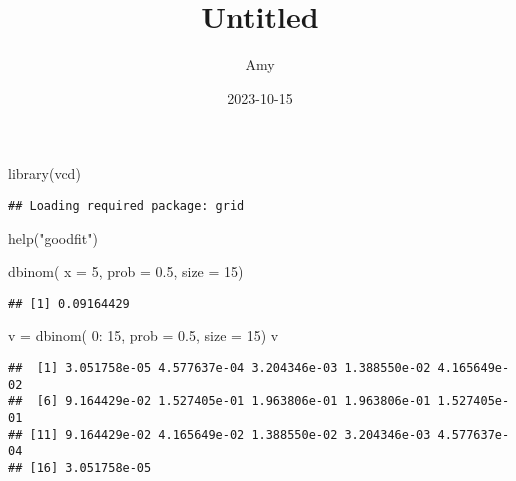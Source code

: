 \documentclass[
]{article}
\title{Untitled}
\author{Amy}
\date{2023-10-15}
\newenvironment{Shaded}{\begin{snugshade}}{\end{snugshade}}
\newcommand{\AttributeTok}[1]{\textcolor[rgb]{0.77,0.63,0.00}{#1}}
\newcommand{\DecValTok}[1]{\textcolor[rgb]{0.00,0.00,0.81}{#1}}
\newcommand{\FloatTok}[1]{\textcolor[rgb]{0.00,0.00,0.81}{#1}}
\newcommand{\FunctionTok}[1]{\textcolor[rgb]{0.00,0.00,0.00}{#1}}
\newcommand{\NormalTok}[1]{#1}
\newcommand{\OtherTok}[1]{\textcolor[rgb]{0.56,0.35,0.01}{#1}}
\newcommand{\SpecialCharTok}[1]{\textcolor[rgb]{0.00,0.00,0.00}{#1}}
\newcommand{\StringTok}[1]{\textcolor[rgb]{0.31,0.60,0.02}{#1}}
\begin{document}
\maketitle

\begin{Shaded}
\begin{Highlighting}[]
\FunctionTok{library}\NormalTok{(}\StringTok{\textquotesingle{}vcd\textquotesingle{}}\NormalTok{)}
\end{Highlighting}
\end{Shaded}

\begin{verbatim}
## Loading required package: grid
\end{verbatim}

\begin{Shaded}
\begin{Highlighting}[]
\FunctionTok{help}\NormalTok{(}\StringTok{"goodfit"}\NormalTok{)}
\end{Highlighting}
\end{Shaded}

\begin{Shaded}
\begin{Highlighting}[]
\FunctionTok{dbinom}\NormalTok{( }\AttributeTok{x =} \DecValTok{5}\NormalTok{, }\AttributeTok{prob =} \FloatTok{0.5}\NormalTok{, }\AttributeTok{size =} \DecValTok{15}\NormalTok{)}
\end{Highlighting}
\end{Shaded}

\begin{verbatim}
## [1] 0.09164429
\end{verbatim}

\begin{Shaded}
\begin{Highlighting}[]
\NormalTok{v }\OtherTok{=} \FunctionTok{dbinom}\NormalTok{( }\DecValTok{0}\SpecialCharTok{:} \DecValTok{15}\NormalTok{, }\AttributeTok{prob =} \FloatTok{0.5}\NormalTok{, }\AttributeTok{size =} \DecValTok{15}\NormalTok{)}
\NormalTok{v}
\end{Highlighting}
\end{Shaded}

\begin{verbatim}
##  [1] 3.051758e-05 4.577637e-04 3.204346e-03 1.388550e-02 4.165649e-02
##  [6] 9.164429e-02 1.527405e-01 1.963806e-01 1.963806e-01 1.527405e-01
## [11] 9.164429e-02 4.165649e-02 1.388550e-02 3.204346e-03 4.577637e-04
## [16] 3.051758e-05
\end{verbatim}
\end{document}
